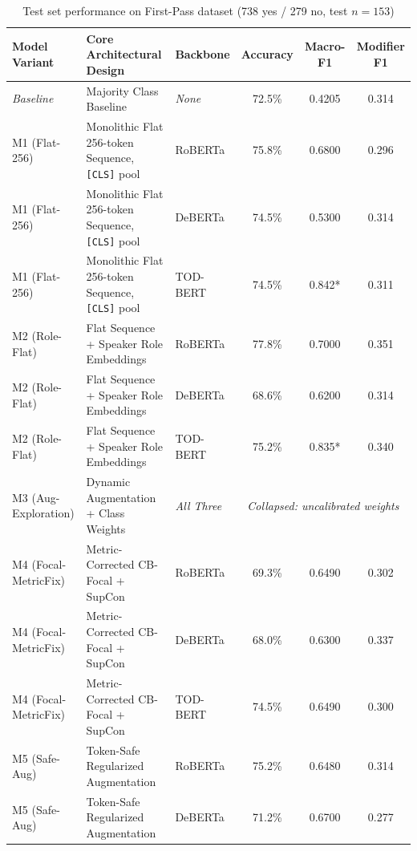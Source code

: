 \begin{table}[p]
  \centering
  \small
  \renewcommand{\arraystretch}{0.93}
  \setlength{\tabcolsep}{3.5pt}
  \caption{Test set performance on First-Pass dataset (738 yes / 279 no, test $n=153$)}
  \label{tab:results-part1}
  \begin{tabularx}{\textwidth}{l>{\raggedright\arraybackslash}Xlccc}
    \toprule
    \textbf{Model Variant} & \textbf{Core Architectural Design} & \textbf{Backbone} & \textbf{Accuracy} & \textbf{Macro-F1} & \textbf{Modifier F1} \\
    \midrule
    \textit{Baseline} & Majority Class Baseline & \textit{None} & 72.5\% & 0.4205 & 0.314 \\
    \midrule
    M1 (Flat-256) & Monolithic Flat 256-token Sequence, \texttt{[CLS]} pool & RoBERTa & 75.8\% & 0.6800 & 0.296 \\
    \rowcolor{lightbg}
    M1 (Flat-256) & Monolithic Flat 256-token Sequence, \texttt{[CLS]} pool & DeBERTa & 74.5\% & 0.5300 & 0.314 \\
    M1 (Flat-256) & Monolithic Flat 256-token Sequence, \texttt{[CLS]} pool & TOD-BERT & 74.5\% & 0.842* & 0.311 \\
    \midrule
    \rowcolor{lightbg}
    M2 (Role-Flat) & Flat Sequence + Speaker Role Embeddings & RoBERTa & 77.8\% & 0.7000 & 0.351 \\
    M2 (Role-Flat) & Flat Sequence + Speaker Role Embeddings & DeBERTa & 68.6\% & 0.6200 & 0.314 \\
    \rowcolor{lightbg}
    M2 (Role-Flat) & Flat Sequence + Speaker Role Embeddings & TOD-BERT & 75.2\% & 0.835* & 0.340 \\
    \midrule
    M3 (Aug-Exploration) & Dynamic Augmentation + Class Weights & \textit{All Three} & \multicolumn{3}{c}{\textit{Collapsed: uncalibrated weights}} \\
    \midrule
    \rowcolor{lightbg}
    M4 (Focal-MetricFix) & Metric-Corrected CB-Focal + SupCon & RoBERTa & 69.3\% & 0.6490 & 0.302 \\
    M4 (Focal-MetricFix) & Metric-Corrected CB-Focal + SupCon & DeBERTa & 68.0\% & 0.6300 & 0.337 \\
    \rowcolor{lightbg}
    M4 (Focal-MetricFix) & Metric-Corrected CB-Focal + SupCon & TOD-BERT & 74.5\% & 0.6490 & 0.300 \\
    \midrule
    M5 (Safe-Aug) & Token-Safe Regularized Augmentation & RoBERTa & 75.2\% & 0.6480 & 0.314 \\
    \rowcolor{lightbg}
    M5 (Safe-Aug) & Token-Safe Regularized Augmentation & DeBERTa & 71.2\% & 0.6700 & 0.277 \\

\end{tabularx}
\end{table}
